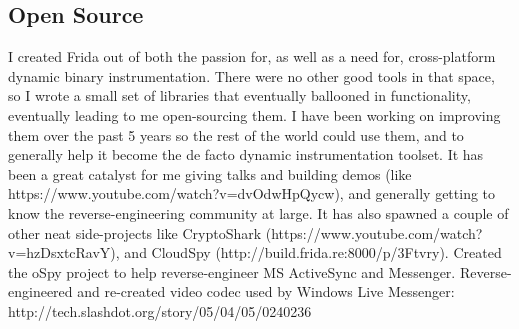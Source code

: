 \documentclass[11pt,a4paper,sans]{moderncv}
\begin{document}
\subsection{Open Source}
{I created Frida out of both the passion for, as well as a need for,
cross-platform dynamic binary instrumentation. There were no other
good tools in that space, so I wrote a small set of libraries that
eventually ballooned in functionality, eventually leading to me
open-sourcing them. I have been working on improving them over the
past 5 years so the rest of the world could use them, and to
generally help it become the de facto dynamic instrumentation
toolset. It has been a great catalyst for me giving talks and
building demos (like https://www.youtube.com/watch?v=dvOdwHpQycw),
and generally getting to know the reverse-engineering community at large.\linebreak
\linebreak
It has also spawned a couple of other neat side-projects like
CryptoShark (https://www.youtube.com/watch?v=hzDsxtcRavY),
and CloudSpy (http://build.frida.re:8000/p/3Ftvry).}
{Created the oSpy project to help reverse-engineer MS ActiveSync and Messenger.}
{Reverse-engineered and re-created video codec used by Windows Live Messenger:
http://tech.slashdot.org/story/05/04/05/0240236}

\nocite{*}


\end{document}
